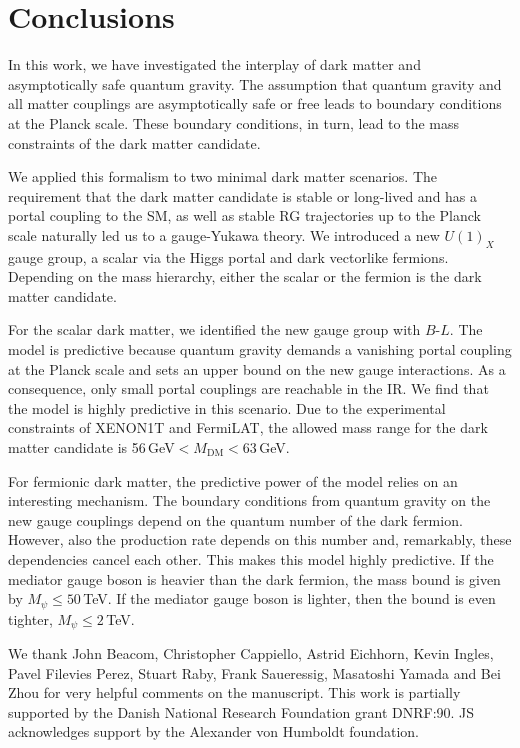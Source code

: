 \documentclass[aps,prd,twocolumn,preprintnumbers,superscriptaddress,nobibnotes,floatfix,longbibliography]{revtex4-1}
\newcommand{\MDM}{M_{\text{DM}}}
\begin{document}
\section{Conclusions}
\label{sec:summary}
In this work, we have investigated the interplay of dark matter and asymptotically safe quantum gravity.
The assumption that quantum gravity and all matter couplings are asymptotically safe or free leads to boundary conditions at the Planck scale.
These boundary conditions, in turn, lead to the mass constraints of the dark matter candidate.

We applied this formalism to two minimal dark matter scenarios.
The requirement that the dark matter candidate is stable or long-lived and has a portal coupling to the SM, as well as stable RG trajectories up to the Planck scale naturally led us to a gauge-Yukawa theory.
We introduced a new $U(1)_X$ gauge group, a scalar via the Higgs portal and dark vectorlike fermions.
Depending on the mass hierarchy, either the scalar or the fermion is the dark matter candidate.

For the scalar dark matter, we identified the new gauge group with $B$-$L$.
The model is predictive because quantum gravity demands a vanishing portal coupling at the Planck scale and sets an upper bound on the new gauge interactions.
As a consequence, only small portal couplings are reachable in the IR.
We find that the model is highly predictive in this scenario.
Due to the experimental constraints of XENON1T and FermiLAT, 
the allowed mass range for the dark matter candidate is 56\,GeV$ <  \MDM < 63$\,GeV.

For fermionic dark matter, the predictive power of the model relies on an interesting mechanism.
The boundary conditions from quantum gravity on the new gauge couplings depend on the quantum number of the dark fermion.
However, also the production rate depends on this number and, remarkably, these dependencies cancel each other.
This makes this model highly predictive.
If the mediator gauge boson is heavier than the dark fermion, the mass bound is given by $M_\psi \leq 50$\,TeV.
If the mediator gauge boson is lighter, then the bound is even tighter, $M_\psi \leq 2$\,TeV.

\vspace{.3cm}
We thank John Beacom, Christopher Cappiello, Astrid Eichhorn, Kevin Ingles, Pavel Filevies Perez, Stuart Raby, Frank Saueressig, Masatoshi Yamada and Bei Zhou for very helpful comments on the manuscript. 
This work is partially supported by the Danish National Research Foundation grant DNRF:90. JS acknowledges support by the Alexander von Humboldt foundation. 
\end{document}
